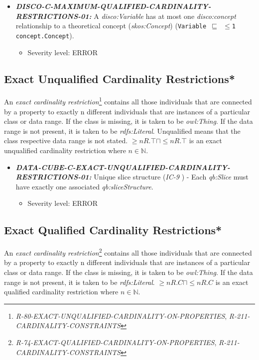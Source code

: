 \documentclass{llncs}
\newcommand{\ms}[1]{\texttt{#1}}
\begin{document}
\begin{itemize}
	\item \textbf{{\em DISCO-C-MAXIMUM-QUALIFIED-CARDINALITY-RESTRICTIONS-01:}}
	A {\em disco:Variable} has at most one {\em disco:concept} relationship to a theoretical concept ({\em skos:Concept}) (\ms{Variable $\sqsubseteq$ $\leq$1 concept.Concept}).
	\begin{itemize}
		\item Severity level: ERROR
	\end{itemize}
\end{itemize}

\subsection{Exact Unqualified Cardinality Restrictions*}

An \emph{exact cardinality restriction}\footnote{{\em R-80-EXACT-UNQUALIFIED-CARDINALITY-ON-PROPERTIES}, {\em R-211-CARDINALITY-CONSTRAINTS}} contains all those individuals that are connected by a property to exactly n different individuals that are instances of a particular class or data range. 
If the class is missing, it is taken to be \emph{owl:Thing}. 
If the data range is not present, it is taken to be \emph{rdfs:Literal}.
Unqualified means that the class respective data range is not stated. 
$\geq n R. \top \sqcap \leq n R. \top $ is an exact unqualified cardinality restriction where $n \in \mathbb{N}$.

\begin{itemize}
	\item \textbf{{\em DATA-CUBE-C-EXACT-UNQUALIFIED-CARDINALITY-RESTRICTIONS-01:}}
	Unique slice structure (\emph{IC-9} \cite{CyganiakReynolds2014}) -  
	Each \emph{qb:Slice} must have exactly one associated \emph{qb:sliceStructure}. 
	\begin{itemize}
		\item Severity level: ERROR
	\end{itemize}
\end{itemize}

\subsection{Exact Qualified Cardinality Restrictions*}

An \emph{exact cardinality restriction}\footnote{{\em R-74-EXACT-QUALIFIED-CARDINALITY-ON-PROPERTIES}, {\em R-211-CARDINALITY-CONSTRAINTS}} contains all those individuals that are connected by a property to exactly n different individuals that are instances of a particular class or data range. 
If the class is missing, it is taken to be \emph{owl:Thing}. 
If the data range is not present, it is taken to be \emph{rdfs:Literal}.
$\geq n R. C \sqcap \leq n R. C $ is an exact qualified cardinality restriction where $n \in \mathbb{N}$.
\end{document}
